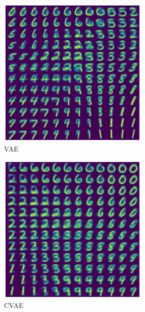 \begin{figure}[H]
	\begin{subfigure}[t]{0.49\textwidth}
		\centering
		\includegraphics[width = 0.8\textwidth]{figures/VAE/interpolation}
		\caption{VAE}
		\label{fig:vae:interpolation}
	\end{subfigure}
	\begin{subfigure}[t]{0.49\textwidth}
		\centering
		\includegraphics[width = 0.8\textwidth]{figures/CVAE/interpolation}
		\caption{CVAE}
		\label{fig:cvae:interpolation}
	\end{subfigure}
	\begin{subfigure}[t]{0.49\textwidth}

\end{subfigure}
\end{figure}
